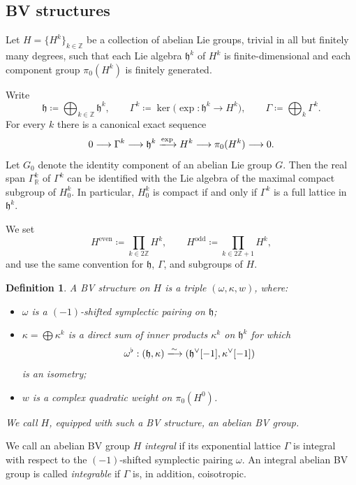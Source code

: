 \documentclass[10pt,a4paper]{amsart}
\numberwithin{table}{section}
\numberwithin{equation}{section}
\newtheorem{defn}{Definition}[section]
\newcommand{\fh}{\mathfrak{h}}
\newcommand{\R}{\mathbb{R}}
\newcommand{\Z}{\mathbb{Z}}
\begin{document}
\subsection{BV structures}

Let $H=\{H^k\}_{k\in\Z}$ be a collection of abelian Lie groups, trivial in all but finitely many degrees, such that each Lie algebra $\fh^k$ of $H^k$ is finite-dimensional and each component group $\pi_0(H^k)$ is finitely generated.

Write
\[
\fh \coloneq \bigoplus_{k\in\Z}\fh^k,
\qquad
\Gamma^k \coloneq \ker\bigl(\exp:\fh^k\to H^k\bigr),
\qquad
\Gamma \coloneq \bigoplus_k\Gamma^k.
\]
For every $k$ there is a canonical exact sequence
\begin{equation}\label{eq:exp-sequence}
	0\longrightarrow \Gamma^k
	\longrightarrow \fh^k
	\xlongrightarrow{\exp} H^k
	\longrightarrow \pi_0(H^k)
	\longrightarrow 0.
\end{equation}
Let $G_0$ denote the identity component of an abelian Lie group $G$. Then the real span $\Gamma^k_\R$ of $\Gamma^k$ can be identified with the Lie algebra of the maximal compact subgroup of $H_0^k$. In particular, $H_0^k$ is compact if and only if $\Gamma^k$ is a full lattice in $\fh^k$.

We set
\[
H^{\mathrm{even}} \coloneq \prod_{k\in2\Z}H^k,
\qquad
H^{\mathrm{odd}} \coloneq \prod_{k\in2\Z+1}H^k,
\]
and use the same convention for $\fh$, $\Gamma$, and subgroups of $H$.


\begin{defn}\label{def:abelian-BV-group}
A \emph{BV structure} on $H$ is a triple $(\omega,\kappa,w)$, where:
\begin{itemize}[leftmargin=2em]
\item $\omega$ is a $(-1)$-shifted symplectic pairing on $\fh$;
\item $\kappa = \bigoplus \kappa^k$ is a direct sum of inner products $\kappa^k$ on $\fh^k$ for which
\[
\omega^\flat:(\fh,\kappa)\xlongrightarrow{\sim}(\fh^\vee[-1],\kappa^\vee[-1])
\]
is an isometry;
\item $w$ is a complex quadratic weight on $\pi_0(H^0)$. 
\end{itemize}
We call $H$, equipped with such a BV structure, an \emph{abelian BV group}.
\end{defn}

We call an abelian BV group $H$ \emph{integral} if its exponential lattice $\Gamma$ is integral with respect to the $(-1)$-shifted symplectic pairing $\omega$. An integral abelian BV group is called \emph{integrable} if $\Gamma$ is, in addition, coisotropic.
\end{document}
